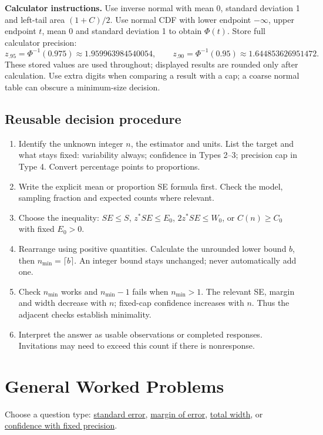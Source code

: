 \textbf{Calculator instructions.} Use inverse normal with mean 0, standard deviation 1 and left-tail area $(1+C)/2$. Use normal CDF with lower endpoint $-\infty$, upper endpoint $t$, mean 0 and standard deviation 1 to obtain $\Phi(t)$. Store full calculator precision:
\[
z_{.95}=\Phi^{-1}(0.975)\approx1.959963984540054,\qquad
z_{.90}=\Phi^{-1}(0.95)\approx1.644853626951472.
\]
These stored values are used throughout; displayed results are rounded only after calculation. Use extra digits when comparing a result with a cap; a coarse normal table can obscure a minimum-size decision.
\subsection{Reusable decision procedure}
\begin{enumerate}
\item Identify the unknown integer $n$, the estimator and units. List the target and what stays fixed: variability always; confidence in Types 2--3; precision cap in Type 4. Convert percentage points to proportions.
\item Write the explicit mean or proportion SE formula first. Check the model, sampling fraction and expected counts where relevant.
\item Choose the inequality: $SE\le S$, $z^*SE\le E_0$, $2z^*SE\le W_0$, or $C(n)\ge C_0$ with fixed $E_0>0$.
\item Rearrange using positive quantities. Calculate the unrounded lower bound $b$, then $n_{\min}=\lceil b\rceil$. An integer bound stays unchanged; never automatically add one.
\item Check $n_{\min}$ works and $n_{\min}-1$ fails when $n_{\min}>1$. The relevant SE, margin and width decrease with $n$; fixed-cap confidence increases with $n$. Thus the adjacent checks establish minimality.
\item Interpret the answer as usable observations or completed responses. Invitations may need to exceed this count if there is nonresponse.
\end{enumerate}
\clearpage
\section{General Worked Problems}\label{sec:worked-solution-examples}
Choose a question type: \hyperref[prob:t1]{standard error},
\hyperref[prob:t2]{margin of error}, \hyperref[prob:t3]{total width}, or
\hyperref[prob:t4]{confidence with fixed precision}.

